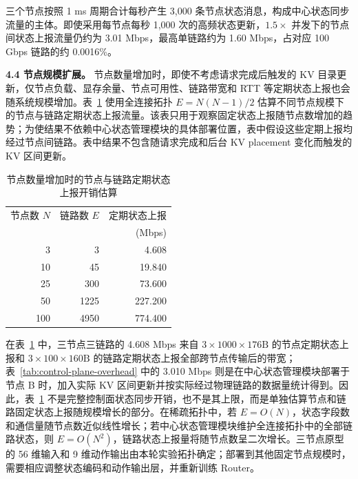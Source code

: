 三个节点按照 1 ms 周期合计每秒产生 3,000 条节点状态消息，构成中心状态同步流量的主体。即使采用每节点每秒 1,000 次的高频状态更新，\(1.5\times\) 并发下的节点间状态上报流量仍约为 3.01 Mbps，最高单链路约为 1.60 Mbps，占对应 100 Gbps 链路的约 0.0016\%。

\textbf{4.4 节点规模扩展。}
节点数量增加时，即使不考虑请求完成后触发的 KV 目录更新，仅节点负载、显存余量、节点可用性、链路带宽和 RTT 等定期状态上报也会随系统规模增加。表~\ref{tab:control-plane-node-scale} 使用全连接拓扑 \(E=N(N-1)/2\) 估算不同节点规模下的节点与链路定期状态上报流量。该表只用于观察固定状态上报随节点数增加的趋势；为使结果不依赖中心状态管理模块的具体部署位置，表中假设这些定期上报均经过节点间链路。表中结果不包含随请求完成和后台 KV placement 变化而触发的 KV 区间更新。

\begin{table}[H]
\centering
\small
\caption{节点数量增加时的节点与链路定期状态上报开销估算}
\label{tab:control-plane-node-scale}
\begin{tabular}{@{}rrr@{}}
\toprule
节点数 \(N\) & 链路数 \(E\) & 定期状态上报 \\
 & & (Mbps) \\
\midrule
3 & 3 & 4.608 \\
10 & 45 & 19.840 \\
25 & 300 & 73.600 \\
50 & 1225 & 227.200 \\
100 & 4950 & 774.400 \\
\bottomrule
\end{tabular}
\end{table}

在表~\ref{tab:control-plane-node-scale} 中，三节点三链路的 4.608 Mbps 来自 \(3\times1000\times176\mathrm{B}\) 的节点定期状态上报和 \(3\times100\times160\mathrm{B}\) 的链路定期状态上报全部跨节点传输后的带宽；表~\ref{tab:control-plane-overhead} 中的 3.010 Mbps 则是在中心状态管理模块部署于节点 B 时，加入实际 KV 区间更新并按实际经过物理链路的数据量统计得到。因此，表~\ref{tab:control-plane-node-scale} 不是完整控制面状态同步开销，也不是其上限，而是单独估算节点和链路固定状态上报随规模增长的部分。在稀疏拓扑中，若 \(E=O(N)\)，状态字段数和通信量随节点数近似线性增长；若中心状态管理模块维护全连接拓扑中的全部链路状态，则 \(E=O(N^2)\)，链路状态上报量将随节点数呈二次增长。三节点原型的 56 维输入和 9 维动作输出由本轮实验拓扑确定；部署到其他固定节点规模时，需要相应调整状态编码和动作输出层，并重新训练 Router。

